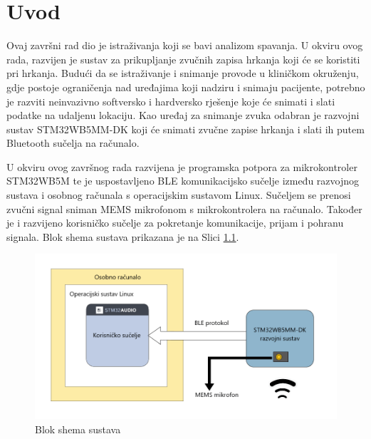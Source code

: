 \chapter{Uvod}


Ovaj završni rad dio je istraživanja koji se bavi analizom spavanja. U okviru ovog rada, razvijen je sustav za prikupljanje zvučnih zapisa hrkanja koji će se koristiti pri hrkanja. Budući da se istraživanje i snimanje provode u kliničkom okruženju, gdje postoje ograničenja nad uređajima koji nadziru i snimaju pacijente, potrebno je razviti neinvazivno softversko i hardversko rješenje koje će snimati i slati podatke na udaljenu lokaciju. Kao uređaj za snimanje zvuka odabran je razvojni sustav STM32WB5MM-DK koji će snimati zvučne zapise hrkanja i slati ih putem Bluetooth sučelja na računalo.  

U okviru ovog završnog rada razvijena je programska potpora za mikrokontroler STM32WB5M te je uspostavljeno BLE komunikacijsko sučelje između razvojnog sustava i osobnog računala s operacijskim sustavom Linux. Sučeljem se prenosi zvučni signal sniman MEMS mikrofonom s mikrokontrolera na računalo. Također je i razvijeno korisničko sučelje za pokretanje komunikacije, prijam i pohranu signala. Blok shema sustava prikazana je na Slici \ref{fig:shema}. 

\begin{figure}[ht]
	\includegraphics[width=\linewidth]{imgs/shema}
	\caption{Blok shema sustava}
	 \label{fig:shema}
\end{figure}

\eject